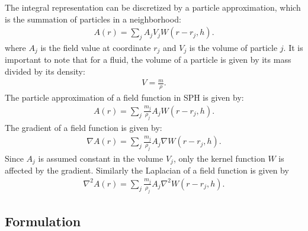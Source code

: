 The integral representation can be discretized by a particle approximation, which is the summation of particles in a neighborhood:
\begin{align}
A(r) = \sum_j A_j V_j W(r-r_j, h).
\end{align}
where $A_j$ is the field value at coordinate $r_j$ and $V_j$ is the volume of
particle $j$. It is important to note that for a fluid, the volume of a particle is given by
its mass divided by its density:
\begin{align}
V = \frac{m}{\rho}.
\end{align}
The particle approximation of a field function in SPH is given by:
\begin{align}
    \label{eqn:sphff}
A(r) = \sum_j \frac{m_j}{\rho_j} A_j W(r - r_j, h).
\end{align} 
The gradient of a field function is given by:
\begin{align}
\nabla A(r) = \sum_j \frac{m_j}{\rho_j} A_j \nabla W(r - r_j, h).
\end{align}
Since $A_j$ is assumed constant in the volume $V_j$, only the kernel function
$W$ is affected by the gradient. Similarly the Laplacian of a field function is
given by
\begin{align}
\nabla^2 A(r) = \sum_j \frac{m_j}{\rho_j} A_j \nabla^2 W(r - r_j, h).
\end{align}


\subsection{Formulation}

